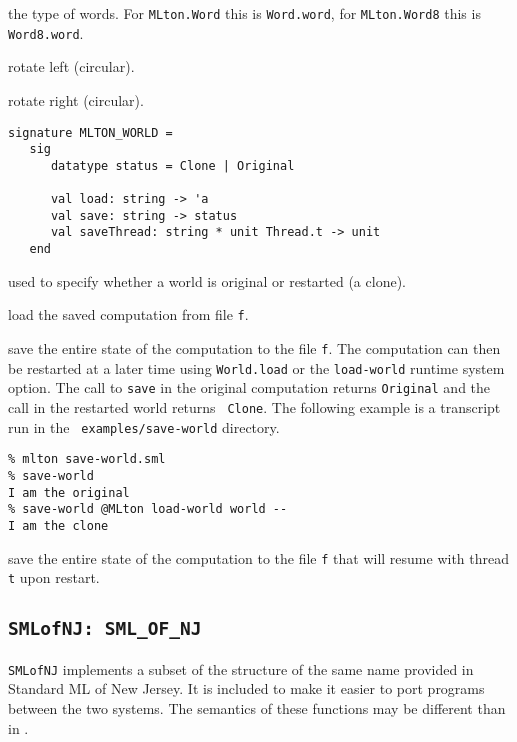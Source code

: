 \begin{description}
the type of words.  For {\tt MLton.Word} this is {\tt Word.word}, for
{\tt MLton.Word8} this is {\tt Word8.word}.

rotate left (circular).

rotate right (circular).
\end{description}

\begin{verbatim}
signature MLTON_WORLD =
   sig
      datatype status = Clone | Original

      val load: string -> 'a
      val save: string -> status
      val saveThread: string * unit Thread.t -> unit
   end
\end{verbatim}

\begin{description}
used to specify whether a world is original or restarted (a clone).

load the saved computation from file {\tt f}.

save the entire state of the computation to
the file {\tt f}.  The computation can then be restarted at a later
time using {\tt World.load} or the {\tt load-world} runtime system
option.  The call to {\tt save} in the original computation returns
{\tt Original} and the call in the restarted world returns {\tt
Clone}.  The following example is a transcript run in the {\tt
examples/save-world} directory.
\begin{verbatim}
% mlton save-world.sml
% save-world
I am the original
% save-world @MLton load-world world --
I am the clone
\end{verbatim}

save the entire state of the computation to
the file {\tt f} that will resume with thread {\tt t} upon restart.

\end{description}
%
\subsection{{\tt SMLofNJ: SML\_OF\_NJ}}

{\tt SMLofNJ} implements a subset of the structure of the same name
provided in Standard ML of New Jersey.  It is included to make it
easier to port programs between the two systems.  The semantics of
these functions may be different than in {\smlnj}.

